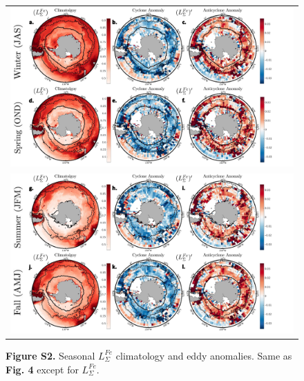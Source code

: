 \documentclass{article}
\begin{document}
\begin{figure}[!htbp]
 \begin{adjustwidth}{-1.2in}{-1.2in}
 \centering
  \begin{tabular}{c }
        \includegraphics[scale=.5]{FigS5a.pdf} \\
        \includegraphics[scale=.5]{FigS5b.pdf} \\
  \end{tabular}
 \end{adjustwidth}
\caption[S2. Seasonal  $L_\Sigma^{Fe}'$ climatology and eddy anomalies. ]
{\textbf{Figure S2.} Seasonal  $L_\Sigma^{Fe}$ climatology and eddy anomalies. Same as \textbf{Fig. 4} except for $L_\Sigma^{Fe}$.
}
\label{fig:FigS2}
\end{figure}
   
\end{document}
